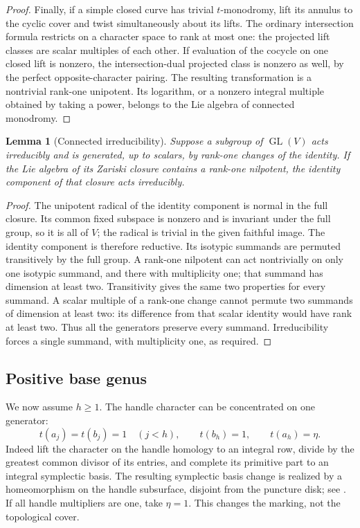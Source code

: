 \documentclass[11pt]{article}
\theoremstyle{plain}
\newtheorem{lemma}[theorem]{Lemma}
\theoremstyle{definition}
\theoremstyle{remark}
\numberwithin{equation}{section}
\begin{document}
\begin{proof}
Finally, if a simple closed curve has trivial $t$-monodromy, lift its
annulus to the cyclic cover and twist simultaneously about its lifts.
The ordinary intersection formula restricts on a character space to
rank at most one: the projected lift classes are scalar multiples of
each other.  If evaluation of the cocycle on one closed lift is nonzero,
the intersection-dual projected class is nonzero as well, by the perfect
opposite-character pairing.  The resulting transformation is a
nontrivial rank-one unipotent.  Its logarithm, or a nonzero integral
multiple obtained by taking a power, belongs to the Lie algebra of
connected monodromy.
\end{proof}

\begin{lemma}[Connected irreducibility]\label{p4:connected-irreducibility}
Suppose a subgroup of $\operatorname{GL}(V)$ acts irreducibly and is generated,
up to scalars, by rank-one changes of the identity.  If the Lie algebra
of its Zariski closure contains a rank-one nilpotent, the identity
component of that closure acts irreducibly.
\end{lemma}

\begin{proof}
The unipotent radical of the identity component is normal in the full
closure.  Its common fixed subspace is nonzero and is invariant under
the full group, so it is all of $V$; the radical is trivial in the
given faithful image.  The identity component is therefore reductive.
Its isotypic summands are permuted transitively by the full group.
A rank-one nilpotent can act nontrivially on only one isotypic summand,
and there with multiplicity one; that summand has dimension at least
two.  Transitivity gives the same two properties for every summand.
A scalar multiple of a rank-one change cannot permute two summands of
dimension at least two: its difference from that scalar identity
would have rank at least two.  Thus all the generators preserve every
summand.  Irreducibility forces a single summand, with multiplicity
one, as required.
\end{proof}

\subsection{Positive base genus}

We now assume $h\ge1$.  The handle character can be concentrated on one
generator:
\begin{equation}\label{p4:handle-character}
 t(a_j)=t(b_j)=1\quad(j<h),\qquad t(b_h)=1,\qquad t(a_h)=\eta.
\end{equation}
Indeed lift the character on the handle homology to an integral row,
divide by the greatest common divisor of its entries, and complete its
primitive part to an integral symplectic basis.  The resulting
symplectic basis change is realized by a homeomorphism on the handle
subsurface, disjoint from the puncture disk; see
\cite[Chapter~6]{FarbMargalit2012}.  If all handle multipliers are one,
take $\eta=1$.  This changes the marking, not the topological cover.
\end{document}
